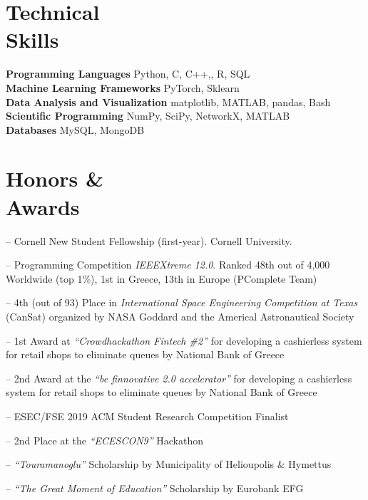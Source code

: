 \documentclass[margin, 10pt]{res}
\newcommand{\field}[2]{\noindent \textbf{#1} \hfill #2 \\}
\begin{document}
\begin{resume}
\section{Technical \\ Skills}

\field{Programming Languages}  {Python, C, C++,, R, SQL  } 
\field{Machine Learning Frameworks}  {PyTorch,  Sklearn} 
\field{Data Analysis and Visualization} {matplotlib, MATLAB, pandas, Bash } 
\field{Scientific Programming} {NumPy, SciPy, NetworkX, MATLAB} 
\field{Databases} {MySQL, MongoDB}

\section{Honors \& \\ Awards} 
\begin{compactitem}
	\item[--] Cornell New Student Fellowship (first-year). Cornell University. 
    \item[--] Programming Competition \emph{IEEEXtreme 12.0}. Ranked 48th out of 4,000 Worldwide (top 1\%), 1st in Greece, 13th in Europe (PComplete Team)
    \item[--] 4th (out of 93) Place in \emph{International Space Engineering  Competition at Texas} (CanSat) organized by NASA Goddard and the Americal Astronautical Society
    \item[--] 1st Award at \emph{``Crowdhackathon Fintech \#2''} for developing a cashierless system for retail shops to eliminate queues by National Bank of Greece
    \item[--] 2nd Award at the \emph{``be finnovative 2.0 accelerator''} for developing a cashierless system for retail shops to eliminate queues by National Bank of Greece
    \item[--] ESEC/FSE 2019 ACM Student Research Competition Finalist
    \item[--] 2nd Place at the \emph{``ECESCON9''} Hackathon 
    \item [--] \emph{``Touramanoglu''} Scholarship by Municipality of Helioupolis \& Hymettus
    \item [--] \emph{``The Great Moment of Education''} Scholarship by Eurobank EFG 

\end{compactitem}



\end{resume}
\end{document}
